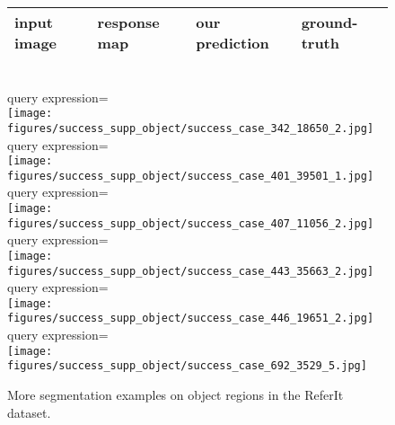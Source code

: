 \documentclass[runningheads]{llncs}
\begin{document}
\begin{figure}[t]
\centering
\begin{tabularx}{0.95\linewidth}{YYYY}
input image & response map & our prediction & ground-truth \\ \hline
\end{tabularx} \\
\small{query expression=} \\
\texttt{[image: figures/success\_supp\_object/success\_case\_342\_18650\_2.jpg]} \\
\small{query expression=} \\
\texttt{[image: figures/success\_supp\_object/success\_case\_401\_39501\_1.jpg]} \\
\small{query expression=} \\
\texttt{[image: figures/success\_supp\_object/success\_case\_407\_11056\_2.jpg]} \\
\small{query expression=} \\
\texttt{[image: figures/success\_supp\_object/success\_case\_443\_35663\_2.jpg]} \\
\small{query expression=} \\
\texttt{[image: figures/success\_supp\_object/success\_case\_446\_19651\_2.jpg]} \\
\small{query expression=} \\
\texttt{[image: figures/success\_supp\_object/success\_case\_692\_3529\_5.jpg]} \\
\caption{More segmentation examples on object regions in the ReferIt dataset.}
\label{fig:sample_object_supp}
\end{figure}
\end{document}
